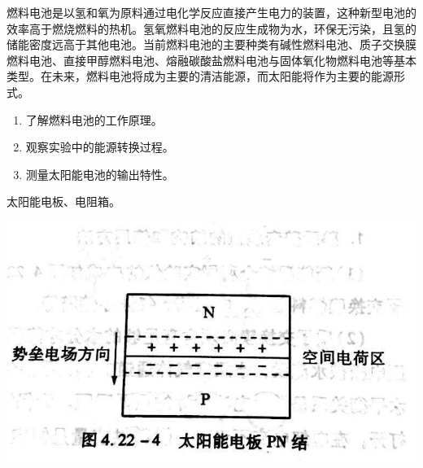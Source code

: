 \documentclass[UTF-8, a4paper, 12pt]{ctexart}
\begin{document}
    \begin{center}
        

    \end{center}
    \songti
    燃料电池是以氢和氧为原料通过电化学反应直接产生电力的装置，这种新型电池的效率高于燃烧燃料的热机。氢氧燃料电池的反应生成物为水，环保无污染，且氢的储能密度远高于其他电池。当前燃料电池的主要种类有碱性燃料电池、质子交换膜燃料电池、直接甲醇燃料电池、熔融碳酸盐燃料电池与固体氧化物燃料电池等基本类型。在未来，燃料电池将成为主要的清洁能源，而太阳能将作为主要的能源形式。

    \textbf{ }

    \songti

    \begin{enumerate}[（1）]
        \item 了解燃料电池的工作原理。
        \item 观察实验中的能源转换过程。
        \item 测量太阳能电池的输出特性。
    \end{enumerate}

    \textbf{ }

    \songti

    太阳能电板、电阻箱。

    \textbf{ }

    \songti

    \begin{center}
        \includegraphics{4.22_1.jpg}
    \end{center}
\end{document}
